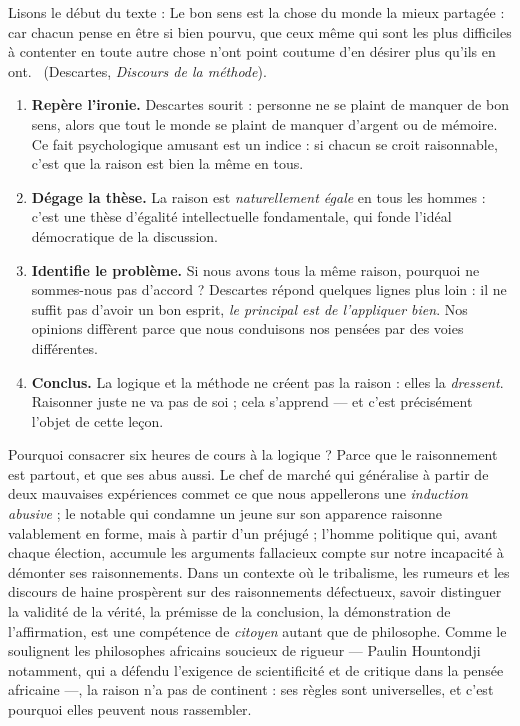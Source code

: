 \documentclass[11pt]{article}
\newcounter{popsec}
\newcounter{popsub}
\newcommand{\courssub}[1]{%
  \stepcounter{popsub}%
  \par\vspace{9pt}\noindent{\popxbold\fontsize{11.5}{13}\selectfont\color{popink}{\color{poporange}\thepopsec.\thepopsub}\hspace{6pt}#1}\par\nopagebreak\vspace{4pt}
}
\begin{document}
\begin{experience}
Lisons le début du texte : \guillemotleft Le bon sens est la chose du monde la mieux partagée : car chacun pense en être si bien pourvu, que ceux même qui sont les plus difficiles à contenter en toute autre chose n'ont point coutume d'en désirer plus qu'ils en ont. \guillemotright\ (Descartes, \emph{Discours de la méthode}).
\begin{enumerate}
\item \textbf{Repère l'ironie.} Descartes sourit : personne ne se plaint de manquer de bon sens, alors que tout le monde se plaint de manquer d'argent ou de mémoire. Ce fait psychologique amusant est un indice : si chacun se croit raisonnable, c'est que la raison est bien la même en tous.
\item \textbf{Dégage la thèse.} La raison est \emph{naturellement égale} en tous les hommes : c'est une thèse d'égalité intellectuelle fondamentale, qui fonde l'idéal démocratique de la discussion.
\item \textbf{Identifie le problème.} Si nous avons tous la même raison, pourquoi ne sommes-nous pas d'accord ? Descartes répond quelques lignes plus loin : il ne suffit pas d'avoir un bon esprit, \emph{le principal est de l'appliquer bien}. Nos opinions diffèrent parce que nous conduisons nos pensées par des voies différentes.
\item \textbf{Conclus.} La logique et la méthode ne créent pas la raison : elles la \emph{dressent}. Raisonner juste ne va pas de soi ; cela s'apprend — et c'est précisément l'objet de cette leçon.
\end{enumerate}
\end{experience}

\courssub{Enjeux : pourquoi apprendre à raisonner ?}

Pourquoi consacrer six heures de cours à la logique ? Parce que le raisonnement est partout, et que ses abus aussi. Le chef de marché qui généralise à partir de deux mauvaises expériences commet ce que nous appellerons une \emph{induction abusive} ; le notable qui condamne un jeune sur son apparence raisonne valablement en forme, mais à partir d'un préjugé ; l'homme politique qui, avant chaque élection, accumule les arguments fallacieux compte sur notre incapacité à démonter ses raisonnements. Dans un contexte où le tribalisme, les rumeurs et les discours de haine prospèrent sur des raisonnements défectueux, savoir distinguer la validité de la vérité, la prémisse de la conclusion, la démonstration de l'affirmation, est une compétence de \emph{citoyen} autant que de philosophe. Comme le soulignent les philosophes africains soucieux de rigueur — Paulin Hountondji notamment, qui a défendu l'exigence de scientificité et de critique dans la pensée africaine —, la raison n'a pas de continent : ses règles sont universelles, et c'est pourquoi elles peuvent nous rassembler.
\end{document}
